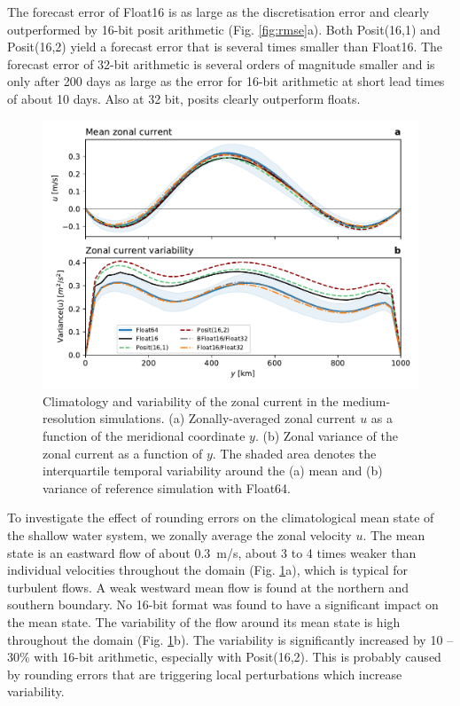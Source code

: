 \documentclass[draft]{agujournal2019}
\begin{document}
The forecast error of Float16 is as large as the discretisation error and
clearly outperformed by 16-bit posit arithmetic (Fig. \ref{fig:rmse}a).
Both Posit(16,1) and Posit(16,2) yield a forecast error that is several times
smaller than Float16. The forecast error of 32-bit arithmetic is several orders
of magnitude smaller and is only after 200 days as large as the error for 16-bit
arithmetic at short lead times of about 10 days. Also at 32 bit, posits clearly
outperform floats.

\begin{figure}
\includegraphics[width=1\textwidth]{meanvar_u.pdf}
\caption{Climatology and variability of the zonal current in the medium-resolution
simulations. (a) Zonally-averaged zonal current $u$ as a function of the meridional
coordinate $y$. (b) Zonal variance of the zonal current as a function of $y$. The
shaded area denotes the interquartile temporal variability around the (a) mean and
(b) variance of reference simulation with Float64.}
\label{fig:mean}
\end{figure}

To investigate the effect of rounding errors on the climatological mean state of
the shallow water system, we zonally average the zonal velocity $u$. The mean
state is an eastward flow of about 0.3~m/s, about 3 to 4 times weaker than
individual velocities throughout the domain (Fig. \ref{fig:mean}a), which is typical
for turbulent flows. A weak westward mean flow is found at the northern and
southern boundary. No 16-bit format was found to have a significant impact on
the mean state. The variability of the flow around its mean state is high
throughout the domain (Fig. \ref{fig:mean}b). The variability is significantly
increased by 10 -- 30\% with 16-bit arithmetic, especially with Posit(16,2).
This is probably caused by rounding errors that are triggering local
perturbations which increase variability.
\end{document}
